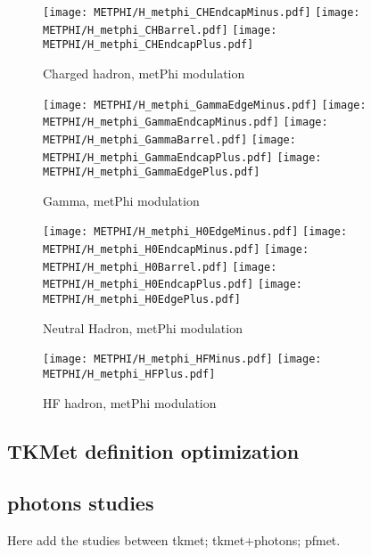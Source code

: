 \begin{figure}[h!]
  \begin{center}
    \texttt{[image: METPHI/H\_metphi\_CHEndcapMinus.pdf]}
    \texttt{[image: METPHI/H\_metphi\_CHBarrel.pdf]}
    \texttt{[image: METPHI/H\_metphi\_CHEndcapPlus.pdf]}
    \caption{Charged hadron, metPhi modulation}
    \label{fig:Charged}
  \end{center}
  \begin{center}
    \texttt{[image: METPHI/H\_metphi\_GammaEdgeMinus.pdf]}
    \texttt{[image: METPHI/H\_metphi\_GammaEndcapMinus.pdf]}
    \texttt{[image: METPHI/H\_metphi\_GammaBarrel.pdf]}
    \texttt{[image: METPHI/H\_metphi\_GammaEndcapPlus.pdf]}
    \texttt{[image: METPHI/H\_metphi\_GammaEdgePlus.pdf]}
    \caption{Gamma, metPhi modulation}
    \label{fig:Gamma}
  \end{center}
  \begin{center}
    \texttt{[image: METPHI/H\_metphi\_H0EdgeMinus.pdf]}
    \texttt{[image: METPHI/H\_metphi\_H0EndcapMinus.pdf]}
    \texttt{[image: METPHI/H\_metphi\_H0Barrel.pdf]}
    \texttt{[image: METPHI/H\_metphi\_H0EndcapPlus.pdf]}
    \texttt{[image: METPHI/H\_metphi\_H0EdgePlus.pdf]}
    \caption{Neutral Hadron, metPhi modulation}
    \label{fig:NeuH}
  \end{center}
  \begin{center}
    \texttt{[image: METPHI/H\_metphi\_HFMinus.pdf]}                                                                                                    
    \texttt{[image: METPHI/H\_metphi\_HFPlus.pdf]}                                                                                                     
    \caption{HF hadron, metPhi modulation}
   \label{fig:HF}
  \end{center}
\end{figure}

\subsection{TKMet definition optimization}
{\color{magenta}{Add the study at 8TeV from Elisabetta with dz, weight, normalized chi2, pt}}

\subsection{photons studies}
{\color{magenta}{SLIDES:3,4}}
Here add the studies between tkmet; tkmet+photons; pfmet.



